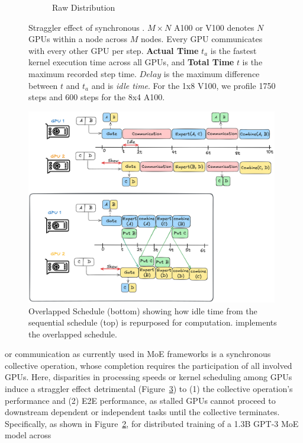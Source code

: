\begin{figure}[!ht]
\begin{subfigure}{0.49\textwidth}
        \caption{Raw Distribution}
        \label{sub:raw_az}
    \end{subfigure}
    \caption{Straggler effect of synchronous \alltoall. $M\times N$ A100 or V100 denotes
        $N$ GPUs within a node across $M$ nodes.
        Every GPU communicates with every other GPU per step.
        \textbf{Actual Time} $t_a$ is the fastest kernel execution time across all GPUs,
        and \textbf{Total Time} $t$ is the maximum recorded step time.
        $Delay$ is the maximum difference between $t$ and $t_a$ and
        is \emph{idle time}. For the 1x8 V100, we
        profile 1750 steps and 600 steps for the 8x4 A100.}
    \label{fig:straggler}
\end{figure}
\begin{figure}[!ht]
    \centering
    \includegraphics[width=0.98\textwidth, keepaspectratio]{figures/s_overlap}
    \caption{Overlapped Schedule (bottom) showing how idle time from the sequential schedule (top)
        is repurposed for computation. \sysname implements the overlapped schedule.}
    \label{fig:overlap}
\end{figure}
\alltoall or \allgather communication as currently used in MoE frameworks
is a synchronous collective operation, whose completion requires the participation of all involved GPUs.
Here, disparities in processing speeds or kernel scheduling
among GPUs induce a straggler effect detrimental (Figure~\ref{fig:overlap}) to (1) the collective operation's performance and (2)
E2E performance, as stalled GPUs cannot proceed to downstream dependent or independent tasks until the collective terminates.
Specifically, as shown in Figure~\ref{fig:straggler}, for distributed training of a 1.3B GPT-3 MoE model across
